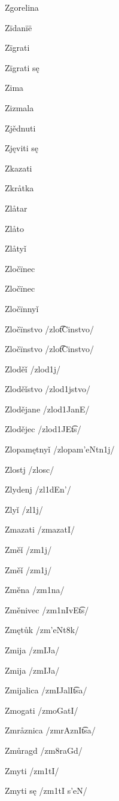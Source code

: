 Zgorelina 

Zïdanïë 

Zïgrati 

Zïgrati sę 

Zima 

Zizmala 

Zjědnuti 

Zjęviti sę 

Zkazati 

Zkråtka 

Zlåtar 

Zlåto 

Zlåtyǐ 

Zločïnec 

Zločïnec 

Zločïnnyǐ 

Zločïnstvo /zlo\t{tC}instvo/

Zločïnstvo /zlo\t{tC}instvo/

Zloděǐ /zlod1j/

Zloděǐstvo /zlod1jstvo/

Zlodějane /zlod1JanE/

Zlodějec /zlod1JE\t{ts}/

Zlopamętnyǐ /zlopam’eNtn1j/

Zlostj /zlosc/

Zlydenj /zl1dEn’/

Zlyǐ /zl1j/

Zmazati /zmazatI/

Změǐ /zm1j/

Změǐ /zm1j/

Změna /zm1na/

Změnivec /zm1nIvE\t{ts}/

Zmętůk /zm’eNt8k/

Zmija /zmIJa/

Zmija /zmIJa/

Zmijalica /zmIJalI\t{ts}a/

Zmogati /zmoGatI/

Zmråznica /zmrAznI\t{ts}a/

Zmůragd /zm8raGd/

Zmyti /zm1tI/

Zmyti sę /zm1tI s’eN/

